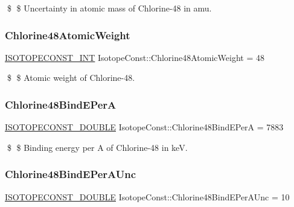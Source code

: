 \$ \$ Uncertainty in atomic mass of Chlorine-\/48 in amu. \mbox{\label{group___isotope_const-_chlorine-_cl48_ga0b38055d3bc76e1c7fcf677ebbc9a3db}} 
\subsubsection{\texorpdfstring{Chlorine48\+Atomic\+Weight}{Chlorine48AtomicWeight}}
{\footnotesize\ttfamily \mbox{\hyperlink{group___isotope_const-_macros_ga5f18360b3e99483a35c32d789e62621c}{I\+S\+O\+T\+O\+P\+E\+C\+O\+N\+S\+T\+\_\+\+I\+NT}} Isotope\+Const\+::\+Chlorine48\+Atomic\+Weight = 48}

\$ \$ Atomic weight of Chlorine-\/48. \mbox{\label{group___isotope_const-_chlorine-_cl48_ga1ea27805eb7cbbdf48e08c5e4eaab99d}} 
\subsubsection{\texorpdfstring{Chlorine48\+Bind\+E\+PerA}{Chlorine48BindEPerA}}
{\footnotesize\ttfamily \mbox{\hyperlink{group___isotope_const-_macros_ga8f45a7272ce02c0b4c65c44636ed719a}{I\+S\+O\+T\+O\+P\+E\+C\+O\+N\+S\+T\+\_\+\+D\+O\+U\+B\+LE}} Isotope\+Const\+::\+Chlorine48\+Bind\+E\+PerA = 7883}

\$ \$ Binding energy per A of Chlorine-\/48 in keV. \mbox{\label{group___isotope_const-_chlorine-_cl48_gac12f145bdb97925adc064be0ebf464ff}} 
\subsubsection{\texorpdfstring{Chlorine48\+Bind\+E\+Per\+A\+Unc}{Chlorine48BindEPerAUnc}}
{\footnotesize\ttfamily \mbox{\hyperlink{group___isotope_const-_macros_ga8f45a7272ce02c0b4c65c44636ed719a}{I\+S\+O\+T\+O\+P\+E\+C\+O\+N\+S\+T\+\_\+\+D\+O\+U\+B\+LE}} Isotope\+Const\+::\+Chlorine48\+Bind\+E\+Per\+A\+Unc = 10}

